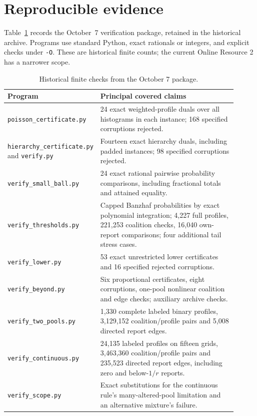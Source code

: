 \documentclass[11pt]{article}
\theoremstyle{definition}\newtheorem{definition}[theorem]{Definition}
\theoremstyle{remark}\newtheorem{remark}[theorem]{Remark}
\begin{document}
\section{Reproducible evidence}\label{app:verification}
Table~\ref{tab:historical-checks} records the October~7 verification package,
retained in the historical archive. Programs use standard Python, exact
rationals or integers, and explicit checks under \texttt{-O}. These are
historical finite counts; the current Online Resource 2 has a narrower scope.
\begin{table}[htbp]
\centering
\caption{Historical finite checks from the October 7 package.}
\label{tab:historical-checks}
\small
\begin{tabular}{p{0.29\linewidth}p{0.62\linewidth}}
\toprule
Program & Principal covered claims\\
\midrule
\texttt{poisson\_certificate.py} & 24 exact weighted-profile duals over all
histograms in each instance; 168 specified corruptions rejected.\\[3pt]
\texttt{hierarchy\_certificate.py} and \texttt{verify.py} & Fourteen exact
hierarchy duals, including padded instances; 98 specified corruptions rejected.\\[3pt]
\texttt{verify\_small\_ball.py} & 24 exact rational pairwise probability
comparisons, including fractional totals and attained equality.\\[3pt]
\texttt{verify\_thresholds.py} & Capped Banzhaf probabilities by exact polynomial
integration; 4,227 full profiles, 221,253 coalition checks, 16,040 own-report
comparisons; four additional tail stress cases.\\[3pt]
\texttt{verify\_lower.py} & 53 exact unrestricted lower certificates and 16
specified rejected corruptions.\\[3pt]
\texttt{verify\_beyond.py} & Six proportional certificates, eight corruptions,
one-pool nonlinear coalition and edge checks; auxiliary archive checks.\\[3pt]
\texttt{verify\_two\_pools.py} & 1,330 complete labeled binary profiles,
3,129,152 coalition/profile pairs and 5,008 directed report edges.\\[3pt]
\texttt{verify\_continuous.py} & 24,135 labeled profiles on fifteen grids,
3,463,360 coalition/profile pairs and 235,523 directed report edges, including
zero and below-$1/r$ reports.\\[3pt]
\texttt{verify\_scope.py} & Exact substitutions for the continuous rule's
many-altered-pool limitation and an alternative mixture's failure.\\
\bottomrule
\end{tabular}
\end{table}
\end{document}
